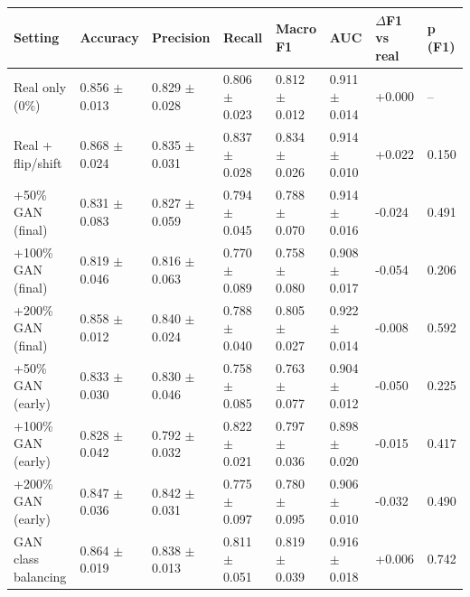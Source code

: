 \begin{tabular}{llllllll}
\toprule
Setting & Accuracy & Precision & Recall & Macro F1 & AUC & $\Delta$F1 vs real & p (F1) \\
\midrule
Real only (0\%) & 0.856 $\pm$ 0.013 & 0.829 $\pm$ 0.028 & 0.806 $\pm$ 0.023 & 0.812 $\pm$ 0.012 & 0.911 $\pm$ 0.014 & +0.000 & -- \\
Real + flip/shift & 0.868 $\pm$ 0.024 & 0.835 $\pm$ 0.031 & 0.837 $\pm$ 0.028 & 0.834 $\pm$ 0.026 & 0.914 $\pm$ 0.010 & +0.022 & 0.150 \\
+50\% GAN (final) & 0.831 $\pm$ 0.083 & 0.827 $\pm$ 0.059 & 0.794 $\pm$ 0.045 & 0.788 $\pm$ 0.070 & 0.914 $\pm$ 0.016 & -0.024 & 0.491 \\
+100\% GAN (final) & 0.819 $\pm$ 0.046 & 0.816 $\pm$ 0.063 & 0.770 $\pm$ 0.089 & 0.758 $\pm$ 0.080 & 0.908 $\pm$ 0.017 & -0.054 & 0.206 \\
+200\% GAN (final) & 0.858 $\pm$ 0.012 & 0.840 $\pm$ 0.024 & 0.788 $\pm$ 0.040 & 0.805 $\pm$ 0.027 & 0.922 $\pm$ 0.014 & -0.008 & 0.592 \\
+50\% GAN (early) & 0.833 $\pm$ 0.030 & 0.830 $\pm$ 0.046 & 0.758 $\pm$ 0.085 & 0.763 $\pm$ 0.077 & 0.904 $\pm$ 0.012 & -0.050 & 0.225 \\
+100\% GAN (early) & 0.828 $\pm$ 0.042 & 0.792 $\pm$ 0.032 & 0.822 $\pm$ 0.021 & 0.797 $\pm$ 0.036 & 0.898 $\pm$ 0.020 & -0.015 & 0.417 \\
+200\% GAN (early) & 0.847 $\pm$ 0.036 & 0.842 $\pm$ 0.031 & 0.775 $\pm$ 0.097 & 0.780 $\pm$ 0.095 & 0.906 $\pm$ 0.010 & -0.032 & 0.490 \\
GAN class balancing & 0.864 $\pm$ 0.019 & 0.838 $\pm$ 0.013 & 0.811 $\pm$ 0.051 & 0.819 $\pm$ 0.039 & 0.916 $\pm$ 0.018 & +0.006 & 0.742 \\
\bottomrule
\end{tabular}
